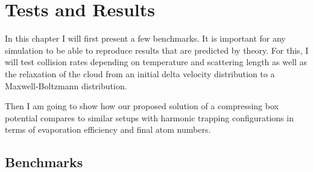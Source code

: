 

\chapter{Tests and Results}
\label{cha:eva_tests_results}

In this chapter I will first present a few benchmarks. It is important for any simulation to be able to reproduce results that are predicted by theory. For this, I will test collision rates depending on temperature and scattering length as well as the relaxation of the cloud from an initial delta velocity distribution to a Maxwell-Boltzmann distribution. 

Then I am going to show how our proposed solution of a compressing box potential compares to similar setups with harmonic trapping configurations in terms of evaporation efficiency and final atom numbers.


\section{Benchmarks}

